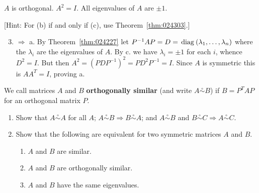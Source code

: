 \begin{multicols}{2}
\begin{ex}
\begin{exenumerate}
\exitem $A$ is orthogonal.
\exitem $A^{2} = I$.
\exitem* All eigenvalues of $A$ are $\pm 1$.
\end{exenumerate}
[Hint: For (b) if and only if (c), use Theorem~\ref{thm:024303}.]


\begin{sol}
\begin{enumerate}[label={\alph*.}]
\setcounter{enumi}{2}
\item $\Rightarrow$ a. By Theorem~\ref{thm:024227} let $P^{-1}AP = D = \thinspace\operatorname{diag\medspace}(\lambda_{1}, \dots, \lambda_{n})$ where the $\lambda_{i}$ are the eigenvalues of $A$. By c. we have $\lambda_{i} = \pm 1$ for each $i$, whence $D^{2} = I$. But then $A^{2} = (PDP^{-1})^{2} = PD^{2}P^{-1} = I$. Since $A$ is symmetric this is $AA^{T} = I$, proving a.

\end{enumerate}
\end{sol}
\end{ex}


\begin{ex}\label{ex:8_2_12}
We call matrices $A$ and $B$ \textbf{orthogonally similar} (and write $A \stackrel{\circ}{\sim} B$) if $B = P^{T}AP$ for an orthogonal matrix $P$.


\begin{enumerate}[label={\alph*.}]
\item Show that $A \stackrel{\circ}{\sim} A$ for all $A$; $A \stackrel{\circ}{\sim} B \Rightarrow B \stackrel{\circ}{\sim} A$; and $A \stackrel{\circ}{\sim} B$ and $B \stackrel{\circ}{\sim} C \Rightarrow A \stackrel{\circ}{\sim} C$.

\item Show that the following are equivalent for two symmetric matrices $A$ and $B$.


\begin{enumerate}[label={\roman*.}]
\item $A$ and $B$ are similar.

\item $A$ and $B$ are orthogonally similar.

\item $A$ and $B$ have the same eigenvalues.

\end{enumerate}
\end{enumerate}
\end{ex}


\end{multicols}
